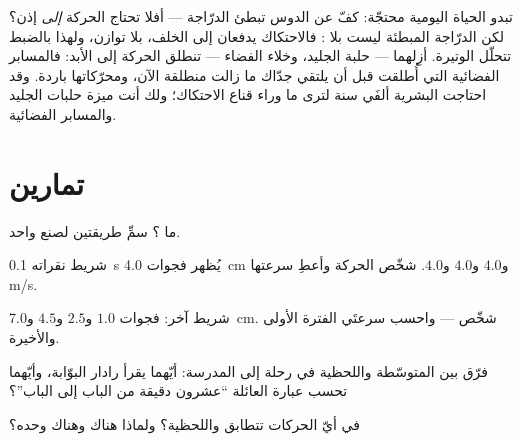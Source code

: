 \begin{remark}\label{rem:g9:uniform-varied-motion:surprise}
تبدو الحياة اليومية محتجّة: كفّ عن الدوس تبطئ الدرّاجة ---
أفلا تحتاج الحركة \emph{إلى}  إذن؟ لكن الدرّاجة المبطئة
ليست بلا : فالاحتكاك  يدفعان إلى الخلف، بلا توازن،
ولهذا بالضبط تتحلّل الوتيرة. أزِلهما --- حلبة الجليد، وخلاء
الفضاء --- تنطلق الحركة إلى الأبد: فالمسابر الفضائية التي
أُطلقت قبل أن يلتقي جدّاك ما زالت منطلقة الآن، ومحرّكاتها
باردة. وقد احتاجت البشرية ألفَي سنة لترى ما وراء قناع
الاحتكاك؛ ولك أنت ميزة حلبات الجليد والمسابر الفضائية.
\end{remark}

\section{تمارين}

\begin{exercise}[$\star$]\label{exo:g9:uniform-varied-motion:1}
ما ؟ سمِّ طريقتين لصنع واحد.
\end{exercise}

\begin{exercise}[$\star$]\label{exo:g9:uniform-varied-motion:2}
شريط نقراته \qty{0.1}{s} يُظهر فجوات \qty{4.0}{cm} و$4.0$
و$4.0$ و$4.0$. شخّص الحركة وأعطِ سرعتها  \unit{m/s}.
\end{exercise}

\begin{exercise}[$\star$]\label{exo:g9:uniform-varied-motion:3}
شريط آخر: فجوات $1.0$ و$2.5$ و$4.5$ و\qty{7.0}{cm}. شخّص ---
واحسب سرعتَي الفترة الأولى والأخيرة.
\end{exercise}

\begin{exercise}[$\star$]\label{exo:g9:uniform-varied-motion:4}
فرّق بين المتوسّطة واللحظية في رحلة إلى المدرسة: أيّهما يقرأ
رادار البوّابة، وأيّهما تحسب عبارة العائلة ``عشرون دقيقة من
الباب إلى الباب''؟
\end{exercise}

\begin{exercise}[$\star$]\label{exo:g9:uniform-varied-motion:5}
في أيّ الحركات تتطابق  واللحظية؟ ولماذا هناك
وهناك وحده؟
\end{exercise}

